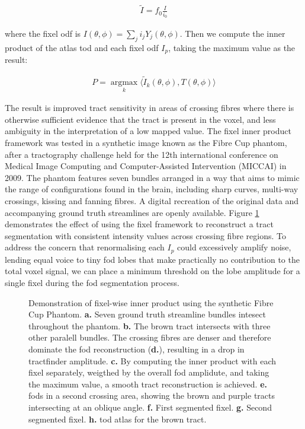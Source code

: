\begin{align}
  \widetilde{I} = f_0\frac{I}{i_0}
\end{align}

where the fixel \gls{odf} is $I(\theta, \phi) = \sum_j i_j Y_j(\theta,\phi)$.
Then we compute the inner product of the atlas \gls{tod} and each fixel \gls{odf} $I_p$, taking the maximum value as the result:

\begin{align}
  P = \operatorname*{argmax}_k \langle \widetilde{I}_k(\theta,\phi), T(\theta,\phi) \rangle
\end{align}

The result is improved tract sensitivity in areas of crossing fibres where there is otherwise sufficient evidence that the tract is present in the voxel, and less ambiguity in the interpretation of a low mapped value.
The fixel inner product framework was tested in a synthetic image known as the Fibre Cup phantom, after a tractography challenge held for the 12th international conference on Medical Image Computing and Computer-Assisted Intervention (MICCAI) in 2009\autocite{Fillard2011}.
The phantom features seven bundles arranged in a way that aims to mimic the range of configurations found in the brain, including sharp curves, multi-way crossings, kissing and fanning fibres.
A digital recreation of the original data and accompanying ground truth streamlines are openly available\autocite{NITRC}.
Figure \ref{fig:fixip} demonstrates the effect of using the fixel framework to reconstruct a tract segmentation with consistent intensity values across crossing fibre regions.
To address the concern that renormalising each $I_p$ could excessively amplify noise, lending equal voice to tiny \gls{fod} lobes that make practically no contribution to the total voxel signal, we can place a minimum threshold on the lobe amplitude for a single fixel during the \gls{fod} segmentation process.

\begin{figure}[tbh!]
  \centering
  
  \caption{Demonstration of fixel-wise inner product using the synthetic Fibre Cup Phantom. \textbf{a.} Seven ground truth streamline bundles intesect throughout the phantom. \textbf{b.} The brown tract intersects with three other paralell bundles. The crossing fibres are denser and therefore dominate the \gls{fod} reconstruction (\textbf{d.}), resulting in a drop in tractfinder amplitude. \textbf{c.} By computing the inner product with each fixel separately, weigthed by the overall \gls{fod} amplidute, and taking the maximum value, a smooth tract reconstruction is achieved. \textbf{e.} \glspl{fod} in a second crossing area, showing the brown and purple tracts intersecting at an oblique angle. \textbf{f.} First segmented fixel. \textbf{g.} Second segmented fixel. \textbf{h.} \gls{tod} atlas for the brown tract.}\label{fig:fixip}
\end{figure}
